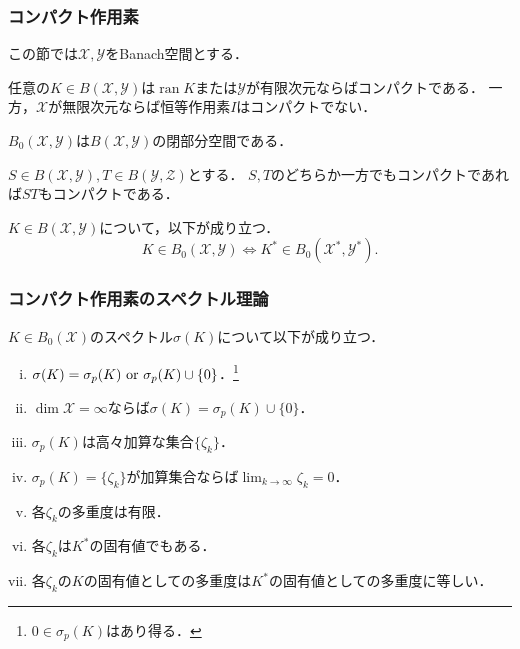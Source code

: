 \documentclass[a4j]{jsarticle}
\newcommand{\ran}{\operatorname{ran}}
\newcommand{\ind}{\operatorname{ind}}
\newcommand{\spX}{\mathscr{X}}
\newcommand{\spY}{\mathscr{Y}}
\newcommand{\spZ}{\mathscr{Z}}
\begin{document}
    \subsubsection{コンパクト作用素}
    この節では$\spX, \spY$をBanach空間とする．
    \begin{Prop}[p.257,p.261] \label{prop-cmp}
        任意の$K \in B(\spX,\spY)$は$\ran K$または$\spY$が有限次元ならばコンパクトである．
        一方，$\spX$が無限次元ならば恒等作用素$I$はコンパクトでない．
    \end{Prop}
    \begin{Them}[定理11.12, p.257] \label{them1112}
        $B_0(\spX,\spY)$は$B(\spX,\spY)$の閉部分空間である．
    \end{Them}
    \begin{Them}[定理11.13, p.258] \label{them1113}
        $S \in B(\spX, \spY), T \in B(\spY,\spZ)$とする．
        $S,T$のどちらか一方でもコンパクトであれば$ST$もコンパクトである．
    \end{Them}
    \begin{Them}[Schauderの定理, 定理11.15, p.258] \label{them1115}
        $K \in B(\spX,\spY)$について，以下が成り立つ．
        \[ K \in B_0(\spX,\spY) \iff K^* \in B_0(\spX^*,\spY^*). \]
    \end{Them}

    \subsubsection{コンパクト作用素のスペクトル理論}
    \begin{Them}[定理11.29, p.269] \label{them1129}
        $K \in B_0(\spX)$のスペクトル$\sigma(K)$について以下が成り立つ．
        \begin{enumerate}[i)]
            \item $\sigma(K)=\sigma_p(K) \text{ or } \sigma_p(K) \cup \{0\}$．\footnote{$0 \in \sigma_p(K)$はあり得る．}
            \item $\dim \spX=\infty$ならば$\sigma(K)=\sigma_p(K) \cup \{0\}$．
            \item $\sigma_p(K)$は高々加算な集合$\{\zeta_k\}$．
            \item $\sigma_p(K)=\{\zeta_k\}$が加算集合ならば$\lim_{k \to \infty}\zeta_k=0$．
            \item 各$\zeta_k$の多重度は有限．
            \item 各$\zeta_k$は$K^*$の固有値でもある．
            \item 各$\zeta_k$の$K$の固有値としての多重度は$K^*$の固有値としての多重度に等しい．
        \end{enumerate}
    \end{Them}
\end{document}
